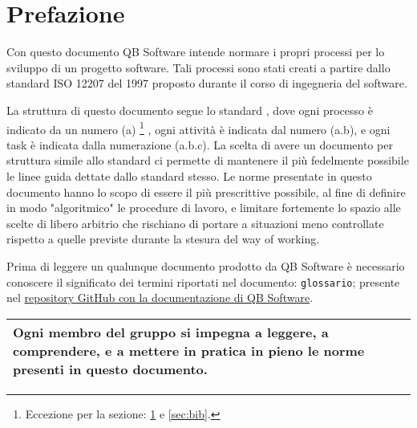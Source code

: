 \section{Prefazione} \label{sec:prefazione}
    Con questo documento QB Software intende normare i propri processi per lo sviluppo di un progetto software. Tali processi sono stati creati a partire dallo standard ISO 12207 del 1997 \cite{bib:ISO12207_1997} proposto durante il corso di ingegneria del software.

    La struttura di questo documento segue lo standard \cite{bib:ISO12207_1997}, dove ogni processo è indicato da un numero (a)%
    \footnote{Eccezione per la sezione: \ref{sec:prefazione} e \ref{sec:bib}.}%
    , ogni attività è indicata dal numero (a.b), e ogni task è indicata dalla numerazione (a.b.c). La scelta di avere un documento per struttura simile allo standard ci permette di mantenere il più fedelmente possibile le linee guida dettate dallo standard stesso. Le norme presentate in questo documento hanno lo scopo di essere il più prescrittive possibile, al fine di definire in modo "algoritmico" le procedure di lavoro, e limitare fortemente lo spazio alle scelte di libero arbitrio che rischiano di portare a situazioni meno controllate rispetto a quelle previste durante la stesura del way of working. 

    Prima di leggere un qualunque documento prodotto da QB Software è necessario conoscere il significato dei termini riportati nel documento: \verb|glossario|; presente nel \href{https://github.com/QB-Software-swe/docs}{repository GitHub con la documentazione di QB Software}.

    \begin{center}
        \begin{tabularx}{0.85\textwidth}{>{\centering\arraybackslash}X}
            \toprule
            Ogni membro del gruppo si impegna a leggere, a comprendere, e a mettere in pratica in pieno le norme presenti in questo documento.
            \\\bottomrule
        \end{tabularx}
    \end{center}